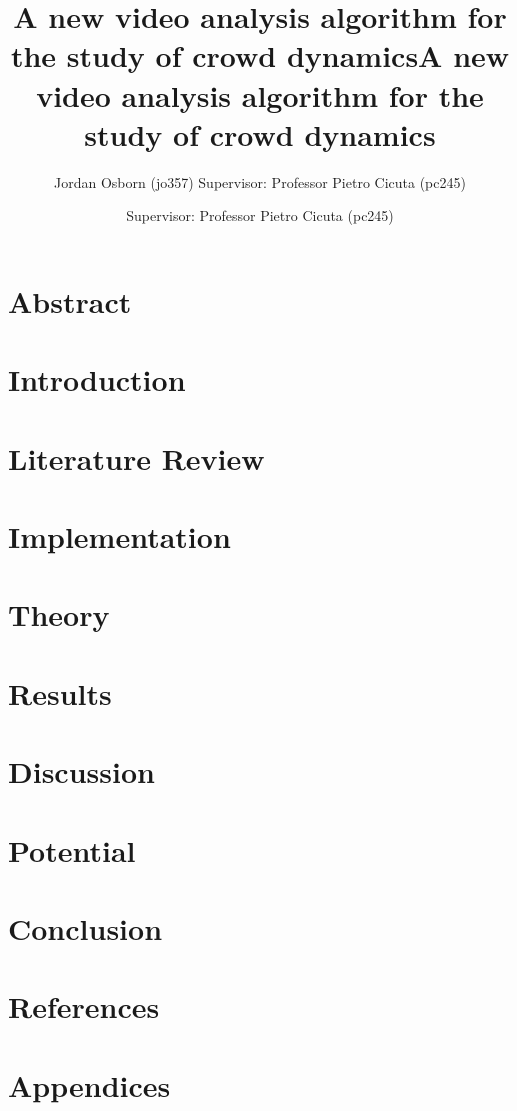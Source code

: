 \documentclass[11pt]{article}
\title{A new video analysis algorithm for the study of crowd dynamics}
\author{Jordan Osborn (jo357) Supervisor: Professor Pietro Cicuta (pc245)}
\begin{document}
\begin{titlingpage}
    \maketitle
\end{titlingpage}


\clearpage

\title{A new video analysis algorithm for the study of crowd dynamics}
\author{Supervisor: Professor Pietro Cicuta (pc245)}
\maketitle
\section*{Abstract}

\clearpage
\tableofcontents
\clearpage
\section{Introduction}

\section{Literature Review}


\section{Implementation}

\section{Theory}

\section{Results}

\section{Discussion}

\section{Potential}

\section{Conclusion}


\clearpage
\section{References}
\printbibliography[heading=none]
\clearpage

\section{Appendices}
\end{document}
